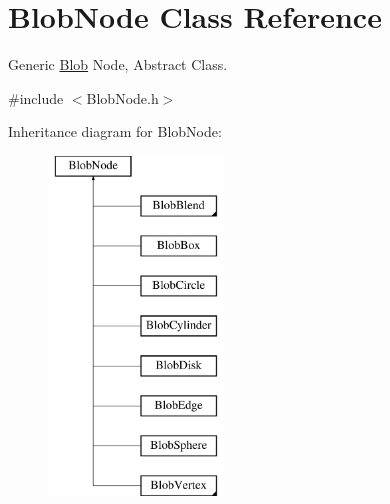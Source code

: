 \hypertarget{class_blob_node}{
\section{BlobNode Class Reference}
\label{class_blob_node}
}


Generic \hyperlink{class_blob}{Blob} Node, Abstract Class.  




{\ttfamily \#include $<$BlobNode.h$>$}

Inheritance diagram for BlobNode:\begin{figure}[H]
\begin{center}
\leavevmode
\includegraphics[height=9.000000cm]{class_blob_node}
\end{center}
\end{figure}
